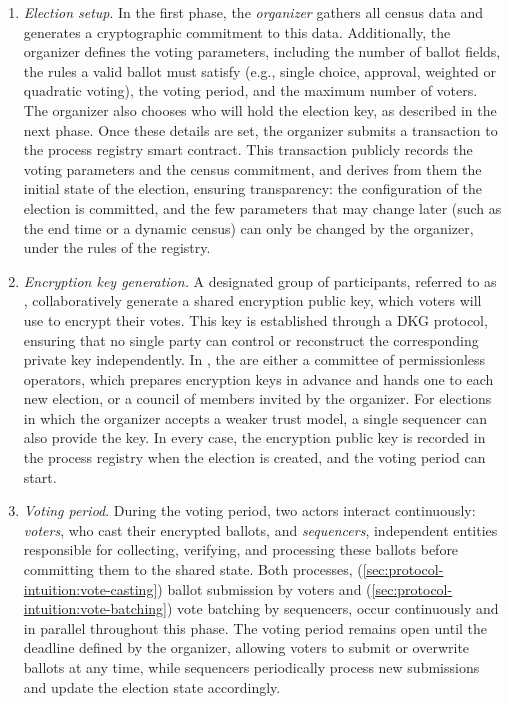 \begin{enumerate}
	\item \textit{Election setup}.
	In the first phase, the \emph{organizer} gathers all census data and generates a cryptographic commitment to this data. Additionally, the organizer defines the voting parameters, including the number of ballot fields, the rules a valid ballot must satisfy (e.g., single choice, approval, weighted or quadratic voting), the voting period, and the maximum number of voters. The organizer also chooses who will hold the election key, as described in the next phase. Once these details are set, the organizer submits a transaction to the process registry smart contract. This transaction publicly records the voting parameters and the census commitment, and derives from them the initial state of the election, ensuring transparency: the configuration of the election is committed, and the few parameters that may change later (such as the end time or a dynamic census) can only be changed by the organizer, under the rules of the registry.\\
	\item \textit{Encryption key generation.}
	A designated group of participants, referred to as \emph{\keywardens}, collaboratively generate a shared encryption public key, which voters will use to encrypt their votes. This key is established through a \ac{DKG} protocol, ensuring that no single party can control or reconstruct the corresponding private key independently. In \davinci, the \keywardens are either a committee of permissionless operators, which prepares encryption keys in advance and hands one to each new election, or a council of members invited by the organizer. For elections in which the organizer accepts a weaker trust model, a single sequencer can also provide the key. In every case, the encryption public key is recorded in the process registry when the election is created, and the voting period can start.\\
	\item \textit{Voting period}.
	During the voting period, two actors interact continuously: \textit{voters}, who cast their encrypted ballots, and \emph{sequencers}, independent entities responsible for collecting, verifying, and processing these ballots before committing them to the shared state. Both processes, (\ref{sec:protocol-intuition:vote-casting}) ballot submission by voters and (\ref{sec:protocol-intuition:vote-batching}) vote batching by sequencers, occur continuously and in parallel throughout this phase.
	The voting period remains open until the deadline defined by the organizer, allowing voters to submit or overwrite ballots at any time, while sequencers periodically process new submissions and update the election state accordingly.\\


\end{enumerate}
